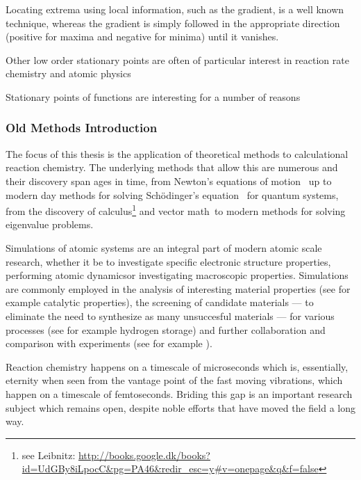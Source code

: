 Locating extrema using local information, such as the gradient, is a well known technique\citemiss, whereas the gradient is simply followed in the appropriate direction (positive for maxima and negative for minima) until it vanishes.


Other low order stationary points are often of particular interest in reaction rate chemistry and atomic physics\expand



Stationary points of functions are interesting for a number of reasons \expand




\subsubsection{Old Methods Introduction}
The focus of this thesis is the application of theoretical methods to calculational reaction chemistry.
The underlying methods that allow this are numerous and their discovery span ages in time, from Newton's equations of motion~\cite{newton-latin} up to modern day methods for solving Sch\"odinger's equation~\cite{schrodinger-equation-1926} for quantum systems\cite{hohenberg-kohn-1964, gpaw-review-2010}, from the discovery of calculus\citemiss\footnote{see Leibnitz: \url{http://books.google.dk/books?id=UdGBy8iLpocC&pg=PA46&redir_esc=y\#v=onepage&q&f=false}} and vector math~\citemiss to modern methods for solving eigenvalue problems\citemiss.

Simulations of atomic systems are an integral part of modern atomic scale research, whether it be to investigate specific electronic structure properties\citemiss, performing atomic dynamics\citemiss or investigating macroscopic properties\citemiss.
Simulations are commonly employed in the analysis of interesting material properties (see for example catalytic properties\citemiss), the screening of candidate materials --- to eliminate the need to synthesize as many unsuccesful materials --- for various processes (see for example hydrogen storage\citemiss) and further collaboration and comparison with experiments (see for example \citemiss).

Reaction chemistry happens on a timescale of microseconds which is, essentially, eternity when seen from the vantage point of the fast moving vibrations, which happen on a timescale of femtoseconds.
Briding this gap is an important research subject which remains open, despite noble efforts that have moved the field a long way\citemiss.

